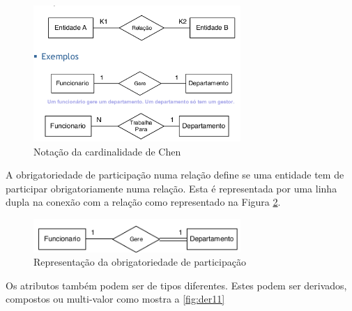 \documentclass[11pt,twoside,a4paper]{report}
\begin{document}
\begin{figure}[H]
	\begin{center}
		\includegraphics[width=0.7\textwidth]{notacao5} %
		\caption{Notação da cardinalidade de Chen}
		\label{fig:der6}
	\end{center}
\end{figure}
A obrigatoriedade de participação numa relação define se uma entidade tem de participar obrigatoriamente numa relação. Esta é representada por uma linha dupla na conexão com a relação como representado na Figura \ref{fig:der9}. %
\begin{figure}[H]
	\begin{center}
		\includegraphics[width=0.7\textwidth]{notacao7} %
		\caption{Representação da obrigatoriedade de participação}
		\label{fig:der9}
	\end{center}
\end{figure}
Os atributos também podem ser de tipos diferentes. Estes podem ser derivados, compostos ou multi-valor como mostra a \autoref{fig:der11}
\end{document}
